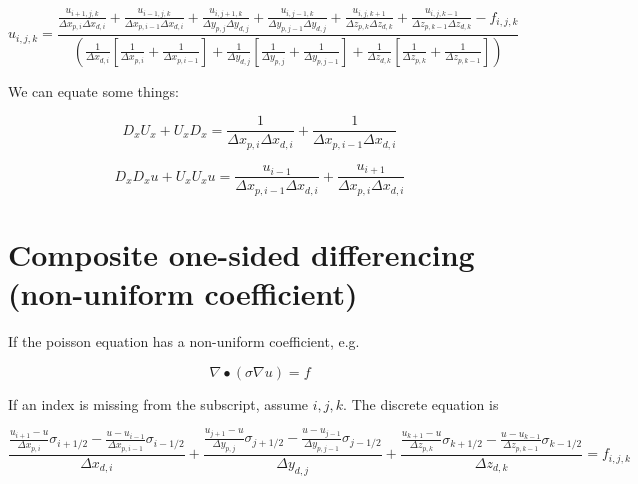 \documentclass[11pt]{article}
\begin{document}
\begin{equation}
	u_{i,j,k} = 
	\frac{ 
	\frac{u_{i+1,j,k}}{\Delta x_{p,i} \Delta x_{d,i}} + \frac{u_{i-1,j,k}}{\Delta x_{p,i-1} \Delta x_{d,i}} + 
	\frac{u_{i,j+1,k}}{\Delta y_{p,j} \Delta y_{d,j}} + \frac{u_{i,j-1,k}}{\Delta y_{p,j-1} \Delta y_{d,j}} +
	\frac{u_{i,j,k+1}}{\Delta z_{p,k} \Delta z_{d,k}} + \frac{u_{i,j,k-1}}{\Delta z_{p,k-1} \Delta z_{d,k}}
	- f_{i,j,k} }{
	\left( 
	\frac{ 1 }{ \Delta x_{d,i} }
	\left[
	\frac{ 1 }{ \Delta x_{p,i} } +
	\frac{ 1 }{ \Delta x_{p,i-1} }
	\right] +
	\frac{ 1 }{ \Delta y_{d,j} }
	\left[
	\frac{ 1 }{ \Delta y_{p,j} } +
	\frac{ 1 }{ \Delta y_{p,j-1} }
	\right] +
	\frac{ 1 }{ \Delta z_{d,k} }
	\left[
	\frac{ 1 }{ \Delta z_{p,k} } +
	\frac{ 1 }{ \Delta z_{p,k-1} }
	\right]
	\right)
	}
\end{equation}

We can equate some things:

\begin{equation}
	D_x U_x +
	U_x D_x
	=
	\frac{1}{\Delta x_{p,i} \Delta x_{d,i}}
	+
	\frac{1}{\Delta x_{p,i-1} \Delta x_{d,i}}
\end{equation}

\begin{equation}
	D_x D_x u +
	U_x U_x u
	=
	\frac{u_{i-1}}{\Delta x_{p,i-1} \Delta x_{d,i}}
	+ 
	\frac{u_{i+1}}{\Delta x_{p,i} \Delta x_{d,i}} 
\end{equation}

\section{Composite one-sided differencing (non-uniform coefficient)}

If the poisson equation has a non-uniform coefficient, e.g.

\begin{equation}
	\nabla \bullet \left( \sigma \nabla u \right) = f
\end{equation}

If an index is missing from the subscript, assume $i,j,k$. The discrete equation is

\begin{equation}
	\frac{\frac{u_{i+1}-u}{\Delta x_{p,i}} \sigma_{i+1/2} - \frac{u-u_{i-1}}{\Delta x_{p,i-1}} \sigma_{i-1/2}}{\Delta x_{d,i}} + 
	\frac{\frac{u_{j+1}-u}{\Delta y_{p,j}} \sigma_{j+1/2} - \frac{u-u_{j-1}}{\Delta y_{p,j-1}} \sigma_{j-1/2}}{\Delta y_{d,j}} +
	\frac{\frac{u_{k+1}-u}{\Delta z_{p,k}} \sigma_{k+1/2} - \frac{u-u_{k-1}}{\Delta z_{p,k-1}} \sigma_{k-1/2}}{\Delta z_{d,k}} = f_{i,j,k}
\end{equation}
\end{document}
